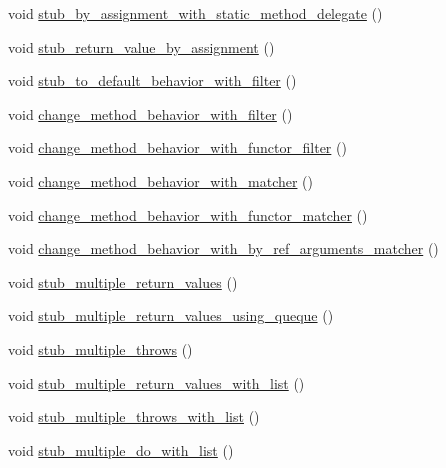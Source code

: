 \begin{DoxyCompactItemize}
\item 
void \mbox{\hyperlink{structBasicStubbing_a54368608bfee5078b81e2cd7f7f015b7}{stub\+\_\+by\+\_\+assignment\+\_\+with\+\_\+static\+\_\+method\+\_\+delegate}} ()
\item 
void \mbox{\hyperlink{structBasicStubbing_a647611acba21e6815e102c09b4ea512c}{stub\+\_\+return\+\_\+value\+\_\+by\+\_\+assignment}} ()
\item 
void \mbox{\hyperlink{structBasicStubbing_ae9721f56dc95d626fafe5c0a93faee0d}{stub\+\_\+to\+\_\+default\+\_\+behavior\+\_\+with\+\_\+filter}} ()
\item 
void \mbox{\hyperlink{structBasicStubbing_a318596a5a12a4fd61a5210f15f861580}{change\+\_\+method\+\_\+behavior\+\_\+with\+\_\+filter}} ()
\item 
void \mbox{\hyperlink{structBasicStubbing_a485e4cb22bb0b5f80744b18f110d5f58}{change\+\_\+method\+\_\+behavior\+\_\+with\+\_\+functor\+\_\+filter}} ()
\item 
void \mbox{\hyperlink{structBasicStubbing_ae5c68428f419c941a52e3b98a5026305}{change\+\_\+method\+\_\+behavior\+\_\+with\+\_\+matcher}} ()
\item 
void \mbox{\hyperlink{structBasicStubbing_a19681a726422085bd1137499283d3233}{change\+\_\+method\+\_\+behavior\+\_\+with\+\_\+functor\+\_\+matcher}} ()
\item 
void \mbox{\hyperlink{structBasicStubbing_abd0500844a43a536a5c1ce082bdb5fd2}{change\+\_\+method\+\_\+behavior\+\_\+with\+\_\+by\+\_\+ref\+\_\+arguments\+\_\+matcher}} ()
\item 
void \mbox{\hyperlink{structBasicStubbing_a393c44c8849198997289232d5715d351}{stub\+\_\+multiple\+\_\+return\+\_\+values}} ()
\item 
void \mbox{\hyperlink{structBasicStubbing_a52e1695c2f453da30bd8600b2e6eabb5}{stub\+\_\+multiple\+\_\+return\+\_\+values\+\_\+using\+\_\+queque}} ()
\item 
void \mbox{\hyperlink{structBasicStubbing_a26018f82d45695a7616d94cc2325aa73}{stub\+\_\+multiple\+\_\+throws}} ()
\item 
void \mbox{\hyperlink{structBasicStubbing_a029447173ab02ef747873876ce35511f}{stub\+\_\+multiple\+\_\+return\+\_\+values\+\_\+with\+\_\+list}} ()
\item 
void \mbox{\hyperlink{structBasicStubbing_a988a9359d3d0114d71bc64e8bd13143d}{stub\+\_\+multiple\+\_\+throws\+\_\+with\+\_\+list}} ()
\item 
void \mbox{\hyperlink{structBasicStubbing_abea7d9ae6fdae188362933e54144fb8a}{stub\+\_\+multiple\+\_\+do\+\_\+with\+\_\+list}} ()

\end{DoxyCompactItemize}
